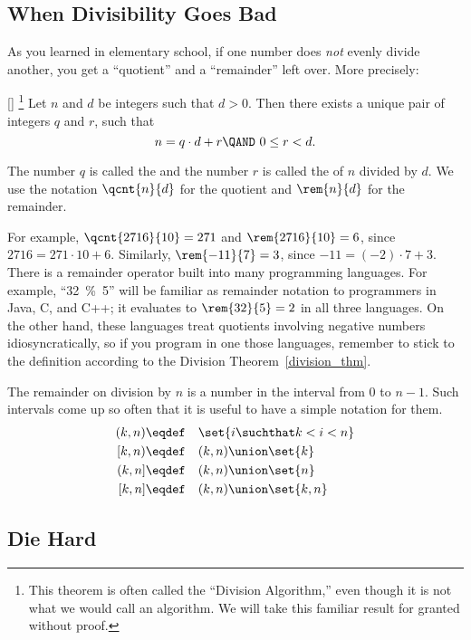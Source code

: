 \subsection{When Divisibility Goes Bad}

As you learned in elementary school, if one number does \emph{not}
evenly divide another, you get a ``quotient'' and a ``remainder'' left
over.  More precisely:
\begin{theorem}\label{division_thm}[]%
\footnote{This theorem is often called the ``Division Algorithm,'' even
though it is not what we would call an algorithm.  We will take this
familiar result for granted without proof.}  Let $n$ and $d$ be
integers such that $d > 0$.  Then there exists a unique pair of
integers $q$ and $r$, such that
\begin{equation}\label{nqdr}
n = q \cdot d + r \QAND\ 0  \leq r < d.
\end{equation}
\end{theorem}
The number $q$ is called the  and the number $r$ is
called the  of $n$ divided by $d$.  We use the
notation $\qcnt{n}{d}$ for the quotient and $\rem{n}{d}$ for the
remainder.

For example, $\qcnt{2716}{10} = 271$ and $\rem{2716}{10} = 6$, since
$2716 = 271 \cdot 10 + 6$.  Similarly, $\rem{-11}{7} = 3$, since $-11
= (-2) \cdot 7 + 3$.  There is a remainder operator built into many
programming languages.  For example, ``32~\%~5'' will be familiar as
remainder notation to programmers in Java, C, and C++; it evaluates
to $\rem{32}{5} =2$ in all three languages.  On the other hand, these
languages treat quotients involving negative numbers
idiosyncratically, so if you program in one those languages, remember
to stick to the definition according to the Division
Theorem~\ref{division_thm}.

The remainder on division by $n$ is a number in the interval from 0 to
$n-1$.  Such intervals come up so often that it is useful to have a
simple notation for them.
\begin{align*}
(k, n) & \eqdef\quad \set{i \suchthat k < i < n}\\
[k, n) & \eqdef\quad (k,n) \union \set{k}\\
(k, n] & \eqdef\quad (k,n) \union \set{n}\\
[k,n]  & \eqdef\quad (k,n) \union \set{k,n}
\end{align*}

\subsection{Die Hard}

